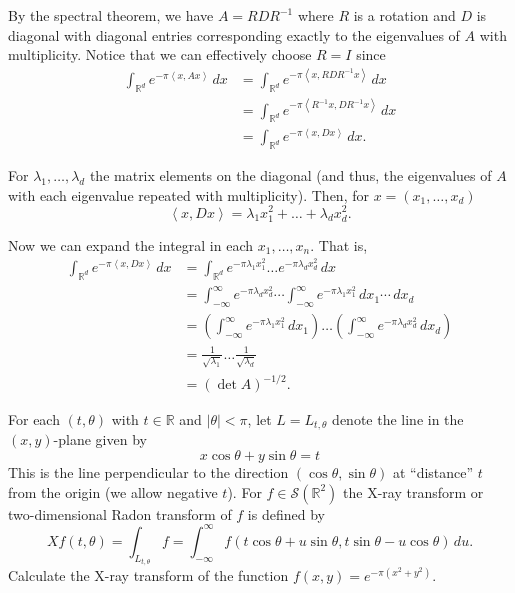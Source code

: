 \documentclass[12 pt, letterpaper]{hmcpset}
\begin{document}
\begin{solution}
	By the spectral theorem, we have $A = R D R^{-1}$ where $R$ is a rotation and $D$ is diagonal with diagonal entries corresponding exactly to the eigenvalues of $A$ with multiplicity. Notice that we can effectively choose $R = I$ since
	\begin{align*}
		\int_{\mathbb{R}^{d}} e^{-\pi \left < x, A x \right >} \, dx & = \int_{\mathbb{R}^{d}} e^{-\pi \left < x, R D R^{-1} x \right >} \, dx \\
									     & = \int_{\mathbb{R}^{d}} e^{- \pi \left < R^{-1} x, D R^{-1} x \right >} \, dx \\
									     & = \int_{\mathbb{R}^{d}} e^{-\pi \left < x, D x \right >} \, dx.
	\end{align*}

	For $\lambda_{1}, \dots, \lambda_{d}$ the matrix elements on the diagonal (and thus, the eigenvalues of $A$ with each eigenvalue repeated with multiplicity). Then, for $x = (x_{1}, \dots, x_{d})$
	\[
		\left < x, Dx \right > = \lambda_{1} x_{1}^{2} + \dots + \lambda_{d} x_{d}^{2}.
	\]

	Now we can expand the integral in each $x_{1}, \dots, x_{n}$. That is,
	\begin{align*}
		\int_{\mathbb{R}^{d}} e^{-\pi \left < x, Dx \right >} \, dx & = \int_{\mathbb{R}^{d}} e^{-\pi \lambda_{1} x_{1}^{2}} \dots e^{-\pi \lambda_{d} x_{d}^{2}} \, dx \\
									    & = \int_{-\infty}^{\infty} e^{-\pi \lambda_{d} x_{d}^{2}} \cdots \int_{-\infty}^{\infty} e^{-\pi \lambda_{1} x_{1}^{2}} \, dx_{1} \cdots \, dx_{d} \\
									    & = \left ( \int_{-\infty}^{\infty} e^{-\pi \lambda_{1} x_{1}^{2}} \, dx_{1}  \right ) \dots \left ( \int_{-\infty}^{\infty} e^{-\pi \lambda_{d} x_{d}^{2}} \, dx_{d}  \right ) \\
									    & = \frac{1}{\sqrt{\lambda_{1}}} \dots \frac{1}{\sqrt{\lambda_{d}}} \\
									    & = (\det A)^{-1/2}.
	\end{align*}
\end{solution}

\pagebreak

\begin{problem}[S \& S 6.6 \#13]
	For each $(t, \theta)$ with $t \in \mathbb{R}$ and $\lvert \theta \rvert < \pi$, let $L = L_{t, \theta}$ denote the line in the $(x, y)$-plane given by
	\[
		x \cos{\theta} + y \sin{\theta} = t
	\]
	This is the line perpendicular to the direction $(\cos{\theta}, \sin{\theta})$ at ``distance'' $t$ from the origin (we allow negative $t$). For $f \in \mathcal{S}(\mathbb{R}^{2})$ the X-ray transform or two-dimensional Radon transform of $f$ is defined by
	\[
		Xf(t, \theta) = \int_{L_{t, \theta}} f = \int_{-\infty}^{\infty} f(t \cos{\theta} + u \sin{\theta}, t \sin{\theta - u \cos{\theta}}) \, du.
	\]
	Calculate the X-ray transform of the function $f(x, y) = e^{-\pi(x^{2} + y^{2})}$.
\end{problem}
\end{document}
